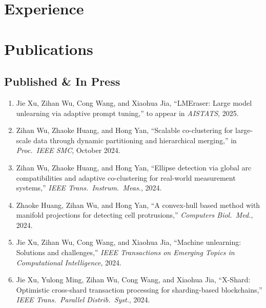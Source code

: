 \documentclass[11pt,a4paper]{moderncv}
\begin{document}
\section{Experience}

\section{Publications}
\subsection*{Published \& In Press}
\begin{enumerate}\setlength\itemsep{2pt}
  \item Jie Xu, Zihan Wu, Cong Wang, and Xiaohua Jia, “LMEraser: Large model unlearning via adaptive prompt tuning,” to appear in \emph{AISTATS}, 2025.
  \item Zihan Wu, Zhaoke Huang, and Hong Yan, “Scalable co-clustering for large-scale data through dynamic partitioning and hierarchical merging,” in \emph{Proc.\ IEEE SMC}, October 2024.
  \item Zihan Wu, Zhaoke Huang, and Hong Yan, “Ellipse detection via global arc compatibilities and adaptive co-clustering for real-world measurement systems,” \emph{IEEE Trans.\ Instrum.\ Meas.}, 2024.
  \item Zhaoke Huang, Zihan Wu, and Hong Yan, “A convex-hull based method with manifold projections for detecting cell protrusions,” \emph{Computers Biol.\ Med.}, 2024.
  \item Jie Xu, Zihan Wu, Cong Wang, and Xiaohua Jia, ``Machine unlearning: Solutions and challenges,'' \emph{IEEE Transactions on Emerging Topics in Computational Intelligence}, 2024.
  \item Jie Xu, Yulong Ming, Zihan Wu, Cong Wang, and Xiaohua Jia, “X-Shard: Optimistic cross-shard transaction processing for sharding-based blockchains,” \emph{IEEE Trans.\ Parallel Distrib.\ Syst.}, 2024.
\end{enumerate}
\end{document}
